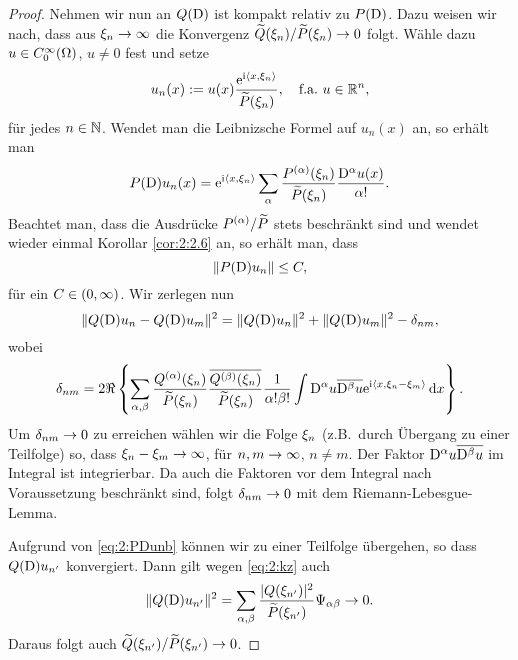 \begin{proof}
Nehmen wir nun an $Q(\mathrm D)$ ist kompakt relativ zu $P(\mathrm D)$.
Dazu weisen wir nach, dass aus $\xi_n\to\infty$ die Konvergenz $\widetilde{Q}(\xi_n)/\widetilde{P}(\xi_n)\to0$ folgt.
Wähle dazu $u\in C^\infty_0(\Omega)$, $u\neq0$ fest und setze
\begin{equation}
u_n(x):=u(x)\frac{\mathrm e^{\mathrm i\langle x,\xi_n\rangle}}{\widetilde{P}(\xi_n)},\quad\text{f.a.}~u\in\mathbb R^n,
\end{equation}
für jedes $n\in\mathbb N$.
Wendet man die Leibnizsche Formel auf $u_n(x)$ an,
so erhält man
\begin{equation}
P(\mathrm D)u_n(x)=\mathrm e^{\mathrm i\langle x,\xi_n\rangle}\sum_\alpha\frac{P^{(\alpha)}(\xi_n)}{\widetilde{P}(\xi_n)}\frac{\mathrm D^\alpha u(x)}{\alpha!}.
\end{equation}
Beachtet man, dass die Ausdrücke $P^{(\alpha)}/\widetilde{P}$ stets beschränkt sind
und wendet wieder einmal Korollar \ref{cor:2:2.6} an,
so erhält man, dass
\begin{equation}\label{eq:2:PDunb}
\lVert P(\mathrm D)u_n\rVert\leq C,
\end{equation}
für ein $C\in(0,\infty)$.
Wir zerlegen nun
\begin{equation}\label{eq:2:kz}
\lVert Q(\mathrm D)u_n-Q(\mathrm D)u_m\rVert^2=\lVert Q(\mathrm D)u_n\rVert^2+\lVert Q(\mathrm D)u_m\rVert^2-\delta_{nm},
\end{equation}
wobei
\begin{equation}
\delta_{nm}=2\Re\left\{\sum_{\alpha,\beta}\frac{Q^{(\alpha)}(\xi_n)}{\widetilde{P}(\xi_n)}\frac{\overline{Q^{(\beta)}(\xi_n)}}{\widetilde{P}(\xi_n)}
\frac1{\alpha!\beta!}\int \mathrm D^\alpha u\overline{\mathrm D^\beta u}\mathrm e^{\mathrm i\langle x,\xi_n-\xi_m\rangle}\,\mathrm d x\right\}.
\end{equation}
Um $\delta_{nm}\to0$ zu erreichen wählen wir die Folge $\xi_n$ (z.B.~durch Übergang zu einer Teilfolge) so,
dass $\xi_n-\xi_m\to\infty$, für $n,m\to\infty$, $n\neq m$.
Der Faktor $\mathrm D^\alpha u\overline{\mathrm D^\beta u}$ im Integral ist integrierbar.
Da auch die Faktoren vor dem Integral nach Voraussetzung beschränkt sind,
folgt $\delta_{nm}\to0$ mit dem Riemann-Lebesgue-Lemma.

Aufgrund von \eqref{eq:2:PDunb} können wir zu einer Teilfolge übergehen,
so dass $Q(\mathrm D)u_{n^\prime}$ konvergiert.
Dann gilt wegen \eqref{eq:2:kz} auch
\begin{equation}
\lVert Q(\mathrm D)u_{n^\prime}\rVert^2=\sum_{\alpha,\beta}\frac{\lvert Q(\xi_{n^\prime})\rvert^2}{\widetilde{P}(\xi_{n^\prime})}\Psi_{\alpha\beta}\to0.
\end{equation}
Daraus folgt auch $\widetilde{Q}(\xi_{n^\prime})/\widetilde{P}(\xi_{n^\prime})\to0$.
\end{proof}
